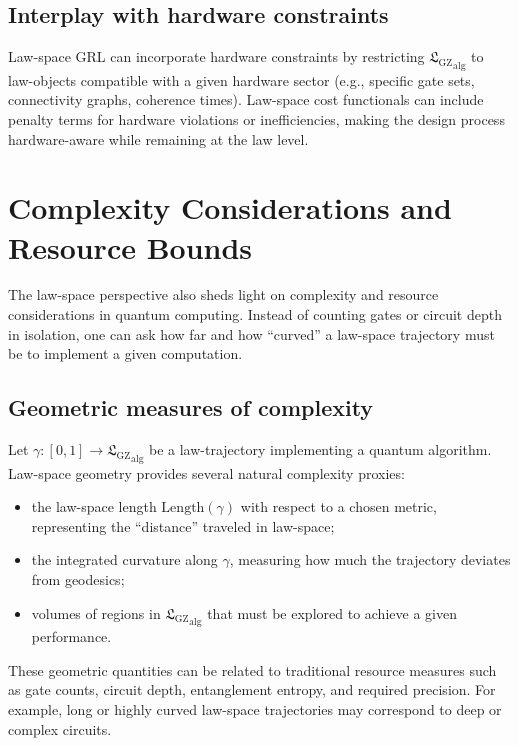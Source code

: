 \documentclass[11pt]{book}
\newcommand{\GZLS}{\ensuremath{\mathfrak{L}_{\mathrm{GZ}}}}
\theoremstyle{plain}
\theoremstyle{definition}
\theoremstyle{remark}
\begin{document}
\subsection*{Interplay with hardware constraints}

Law-space GRL can incorporate hardware constraints by restricting
${\GZLS}_{\mathrm{alg}}$ to law-objects compatible with a given
hardware sector (e.g., specific gate sets, connectivity graphs,
coherence times). Law-space cost functionals can include penalty
terms for hardware violations or inefficiencies, making the design
process hardware-aware while remaining at the law level.

\section{Complexity Considerations and Resource Bounds}
\label{sec:q-complexity-resources}


The law-space perspective also sheds light on complexity and
resource considerations in quantum computing. Instead of counting
gates or circuit depth in isolation, one can ask how far and how
``curved'' a law-space trajectory must be to implement a given
computation.

\subsection*{Geometric measures of complexity}

Let $\gamma \colon [0,1] \to {\GZLS}_{\mathrm{alg}}$ be a
law-trajectory implementing a quantum algorithm. Law-space geometry
provides several natural complexity proxies:
\begin{itemize}
  \item the law-space length
        $\mathrm{Length}(\gamma)$ with respect to a chosen metric,
        representing the ``distance'' traveled in law-space;
  \item the integrated curvature along $\gamma$, measuring how much
        the trajectory deviates from geodesics;
  \item volumes of regions in ${\GZLS}_{\mathrm{alg}}$ that must be
        explored to achieve a given performance.
\end{itemize}

These geometric quantities can be related to traditional resource
measures such as gate counts, circuit depth, entanglement entropy,
and required precision. For example, long or highly curved
law-space trajectories may correspond to deep or complex circuits.
\end{document}

